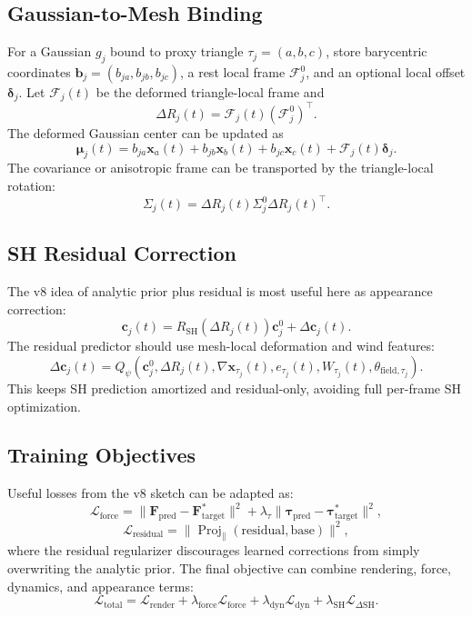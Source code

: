 \documentclass[11pt]{article}
\begin{document}
\subsection{Gaussian-to-Mesh Binding}

For a Gaussian \(g_j\) bound to proxy triangle \(\tau_j=(a,b,c)\), store barycentric coordinates \(\mathbf{b}_j=(b_{ja},b_{jb},b_{jc})\), a rest local frame \(\mathcal{F}_j^0\), and an optional local offset \(\boldsymbol{\delta}_j\). Let \(\mathcal{F}_j(t)\) be the deformed triangle-local frame and
\[
  \Delta R_j(t)=\mathcal{F}_j(t)(\mathcal{F}_j^0)^\top .
\]
The deformed Gaussian center can be updated as
\[
  \boldsymbol{\mu}_j(t)
  =
  b_{ja}\mathbf{x}_a(t)
  +
  b_{jb}\mathbf{x}_b(t)
  +
  b_{jc}\mathbf{x}_c(t)
  +
  \mathcal{F}_j(t)\boldsymbol{\delta}_j.
\]
The covariance or anisotropic frame can be transported by the triangle-local rotation:
\[
  \Sigma_j(t)
  =
  \Delta R_j(t)\Sigma_j^0 \Delta R_j(t)^\top.
\]

\subsection{SH Residual Correction}

The v8 idea of analytic prior plus residual is most useful here as appearance correction:
\[
  \mathbf{c}_j(t)
  =
  R_{\mathrm{SH}}\left(\Delta R_j(t)\right)\mathbf{c}_j^0
  +
  \Delta\mathbf{c}_j(t).
\]
The residual predictor should use mesh-local deformation and wind features:
\[
  \Delta\mathbf{c}_j(t)
  =
  Q_\psi
  \left(
    \mathbf{c}_j^0,
    \Delta R_j(t),
    \nabla\mathbf{x}_{\tau_j}(t),
    e_{\tau_j}(t),
    W_{\tau_j}(t),
    \theta_{\mathrm{field},\tau_j}
  \right).
\]
This keeps SH prediction amortized and residual-only, avoiding full per-frame SH optimization.

\subsection{Training Objectives}

Useful losses from the v8 sketch can be adapted as:
\[
  \mathcal{L}_{\mathrm{force}}
  =
  \|\mathbf{F}_{\mathrm{pred}}-\mathbf{F}_{\mathrm{target}}^\ast\|^2
  +
  \lambda_\tau
  \|\boldsymbol{\tau}_{\mathrm{pred}}-\boldsymbol{\tau}_{\mathrm{target}}^\ast\|^2,
\]
\[
  \mathcal{L}_{\mathrm{residual}}
  =
  \|\operatorname{Proj}_{\parallel}(\mathrm{residual},\mathrm{base})\|^2,
\]
where the residual regularizer discourages learned corrections from simply overwriting the analytic prior. The final objective can combine rendering, force, dynamics, and appearance terms:
\[
  \mathcal{L}_{\mathrm{total}}
  =
  \mathcal{L}_{\mathrm{render}}
  +
  \lambda_{\mathrm{force}}\mathcal{L}_{\mathrm{force}}
  +
  \lambda_{\mathrm{dyn}}\mathcal{L}_{\mathrm{dyn}}
  +
  \lambda_{\mathrm{SH}}\mathcal{L}_{\Delta \mathrm{SH}}.
\]
\end{document}
